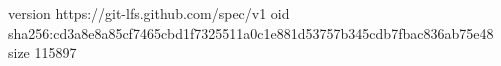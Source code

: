 version https://git-lfs.github.com/spec/v1
oid sha256:cd3a8e8a85cf7465cbd1f7325511a0c1e881d53757b345cdb7fbac836ab75e48
size 115897
